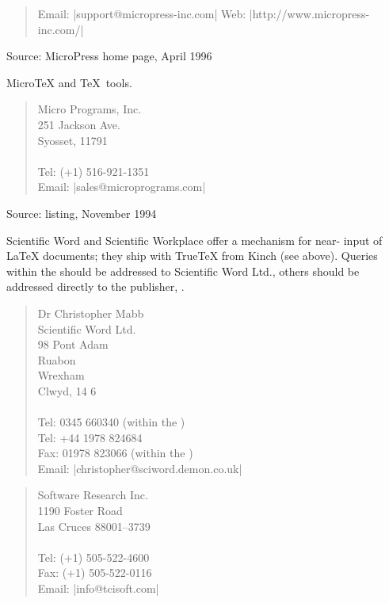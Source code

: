\begin{description}
\begin{quote}
    Email: \Email|support@micropress-inc.com|
    Web: \URL|http://www.micropress-inc.com/|
  \end{quote}
  Source: MicroPress home page, April 1996
\item[\acro{PC}; micro\TeX{}] Micro\TeX{} and \TeX{}~tools.
  \begin{quote}
    Micro Programs, Inc.\\
    251 Jackson Ave.\\
    Syosset,  11791\\
    \\[.25\baselineskip]
    Tel: (+1) 516-921-1351\\
    Email: \Email|sales@microprograms.com|
  \end{quote}
  Source:  listing, November 1994
\item[\acro{PC}; Scientific Word] Scientific Word and Scientific Workplace
  offer a mechanism for near-\WYSIWYG{} input of \LaTeX{} documents; they
  ship with True\TeX{} from Kinch (see above).  Queries within the 
  should be addressed to Scientific Word Ltd., others should be
  addressed directly to the publisher, .
  \begin{quote}
    Dr Christopher Mabb\\
    Scientific Word Ltd.\\
    98 Pont Adam\\
    Ruabon\\
    Wrexham\\
    Clwyd, 14 6\\
    \\[0.25\baselineskip]
    Tel: 0345 660340 (within the ) \\
    Tel: +44 1978 824684 \\
    Fax: 01978 823066 (within the ) \\
    Email: \Email|christopher@sciword.demon.co.uk|
  \end{quote}
  \begin{quote}
     Software Research Inc.\\
    1190 Foster Road\\
    Las Cruces  88001--3739\\
    \\[0.25\baselineskip]
    Tel: (+1) 505-522-4600\\
    Fax: (+1) 505-522-0116\\
    Email: \Email|info@tcisoft.com|\\

\end{quote}
\end{description}
